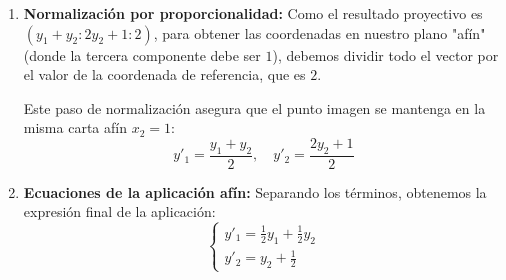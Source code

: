 {\begin{enumerate}
    \item \textbf{Normalización por proporcionalidad:}
    Como el resultado proyectivo es $(y_1 + y_2 : 2y_2 + 1 : 2)$, para obtener las coordenadas en nuestro plano "afín" (donde la tercera componente debe ser $1$), debemos dividir todo el vector por el valor de la coordenada de referencia, que es $2$. 
    
    Este paso de normalización asegura que el punto imagen se mantenga en la misma carta afín $x_2=1$:
    \[
    y'_1 = \frac{y_1 + y_2}{2}, \quad y'_2 = \frac{2y_2 + 1}{2}
    \]

    \item \textbf{Ecuaciones de la aplicación afín:}
    Separando los términos, obtenemos la expresión final de la aplicación:
    \[
    \begin{cases}
    y'_1 = \frac{1}{2}y_1 + \frac{1}{2}y_2 \\
    y'_2 = y_2 + \frac{1}{2}
    \end{cases}
    \]
\end{enumerate}
}

